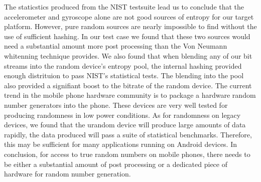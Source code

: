 
    The staticstics produced from the NIST testsuite lead us to conclude that the accelerometer 
and gyroscope alone are not good sources of entropy for our target platform. However, pure random sources are nearly
impossible to find without the use of sufficient hashing. In our test case we found that these two 
 sources would need a substantial amount more post processing than the Von Neumann 
whitenning technique provides. We also found that when blending any of our bit streams into 
the random device's entropy pool, the internal hashing provided enough distrituion to pass NIST's statistical
tests. The blending into the pool also provided a signifiant boost to the bitrate of the random device.
    The current trend in the mobile phone hardware community is to package a hardware random
number generators into the phone. These devices are very well tested for producing randomness in low power
conditions. As for randomness on legacy devices, we found that the urandom device will produce large 
amounts of data rapidly, the data produced will pass a suite of statistical benchmarks. Therefore, this may be sufficient for
many applications running on Android devices. In conclusion, for access to true random numbers on mobile phones, there
needs to be either a substantial amount of post processing or a dedicated piece of hardware for random number generation.

